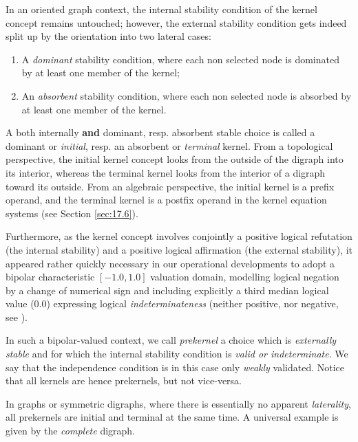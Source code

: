 In an oriented graph context, the internal stability condition of the kernel concept remains untouched; however, the external stability condition gets indeed split up by the orientation into two lateral cases:
\begin{enumerate}
\item A \emph{dominant} stability condition, where each non selected node is dominated by at least one member of the kernel;
\item An \emph{absorbent} stability condition, where each non selected node is absorbed by at least one member of the kernel.
\end{enumerate}
A both internally \textbf{and} dominant, resp. absorbent stable choice is called a dominant or \emph{initial}, resp. an absorbent or \emph{terminal} kernel. From a topological perspective, the initial kernel concept looks from the outside of the digraph into its interior, whereas the terminal kernel looks from the interior of a digraph toward its outside. From an algebraic perspective, the initial kernel is a prefix operand, and the terminal kernel is a postfix operand in the \Berge kernel equation systems (see Section \ref{sec:17.6}).

Furthermore, as the kernel concept involves conjointly a positive logical refutation (the internal stability) and a positive logical affirmation (the external stability), it appeared rather quickly necessary in our operational developments to adopt a bipolar characteristic $[-1.0,1.0]$ valuation domain, modelling logical negation by a change of numerical sign and including explicitly a third median logical value ($0.0$) expressing logical \emph{indeterminateness} (neither positive, nor negative, see \citep{BIS-2000,BIS-2002,BIS-2004a}).

In such a  bipolar-valued context, we call \emph{prekernel} a choice which is \emph{externally stable} and for which the internal stability condition is \emph{valid or indeterminate}. We say that the independence condition is in this case only \emph{weakly} validated. Notice that all kernels are hence prekernels, but not vice-versa.

In graphs or symmetric digraphs, where there is essentially no apparent \emph{laterality}, all prekernels are initial and terminal at the same time. A universal example is given by the \emph{complete} digraph.


